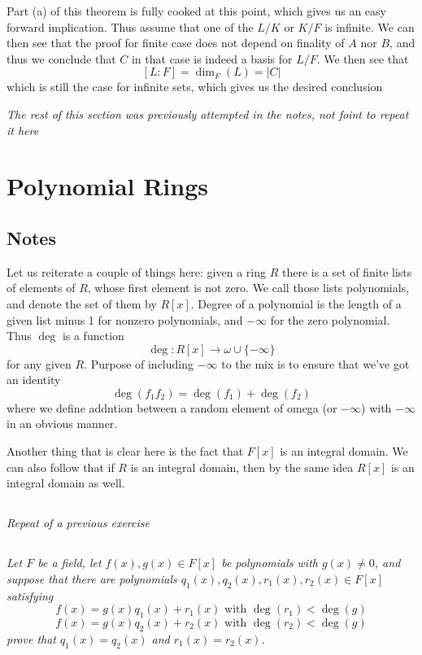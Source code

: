 \documentclass[11pt,oneside,titlepage]{book}
\newcommand{\set}[1]{\{ #1 \}}
\begin{document}
Part (a) of this theorem is fully cooked at this point, which gives us
an easy forward implication. Thus assume that one of the $L/K$ or
$K/F$ is infinite. We can then see that the proof for finite case does
not depend on finality of $A$ nor $B$, and thus we conclude that $C$
in that case is indeed a basis for $L/F$. We then see that
$$[L:F] = \dim_F(L) = |C|$$
which is still the case for infinite sets, which gives us the desired
conclusion

\textit{The rest of this section was previously attempted in the
notes, not foint to repeat it here}

\section{Polynomial Rings}

\subsection*{Notes}

Let us reiterate a couple of things here: given a ring $R$ there is a
set of finite lists of elements of $R$, whose first element is not
zero. We call those lists polynomials, and denote the set of them by
$R[x]$. Degree of a polynomial is the length of a given list minus 1
for nonzero polynomials, and $-\infty$ for the zero polynomial. Thus
$\deg$ is a function
$$\deg: R[x] \to \omega \cup \set{-\infty}$$
for any given $R$. Purpose of including $-\infty$ to the mix is to
ensure that we've got an identity
$$\deg(f_1 f_2) = \deg(f_1) + \deg(f_2)$$
where we define addntion between a random element of omega (or
$-\infty$) with $-\infty$ in an obvious manner.

Another thing that is clear here is the fact that $F[x]$ is an
integral domain. We can also follow that if $R$ is an integral domain,
then by the same idea $R[x]$ is an integral domain as well.

\subsection{}

\textit{Repeat of a previous exercise}

\subsection{}

\textit{Let $F$ be a field, let $f(x), g(x) \in F[x]$ be polynomials
with $g(x) \neq 0$, and suppose that there are polynomials $q_1(x),
q_2(x), r_1(x), r_2(x) \in F[x]$ satisfying
$$f(x) = g(x) q_1(x) + r_1(x)\text{ with } \deg(r_1) < \deg(g)$$
$$f(x) = g(x) q_2(x) + r_2(x)\text{ with } \deg(r_2) < \deg(g)$$
prove that $q_1(x) = q_2(x)$ and $r_1(x) = r_2(x)$. }
\end{document}
